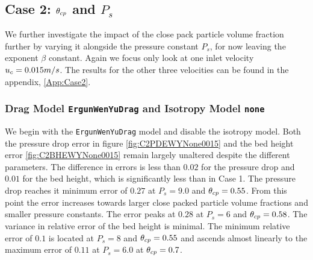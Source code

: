 



\subsection{Case 2: $\theta_{cp}$ and $P_s$}
\label{sec:case2}
We further investigate the impact of the close pack particle volume fraction further by varying it alongside the pressure constant $P_s$, for now leaving the exponent $\beta$ constant.
Again we focus only look at one inlet velocity $u_c = 0.015 m/s$. The results for the other three velocities can be found in the appendix, \ref{App:Case2}.


\subsubsection{Drag Model \lstinline|ErgunWenYuDrag| and Isotropy Model \lstinline|none|}
We begin with the \lstinline|ErgunWenYuDrag| model and disable the isotropy model.
Both the pressure drop error in figure \ref{fig:C2PDEWYNone0015} and the bed height error \ref{fig:C2BHEWYNone0015} remain largely unaltered despite the different parameters.
The difference in errors is less than $0.02$ for the pressure drop and $0.01$ for the bed height, which is significantly less than in Case 1.
The pressure drop reaches it minimum error of $0.27$ at $P_s = 9.0$ and $\theta_{cp} = 0.55$. From this point the error increases towards larger close packed particle volume fractions and smaller pressure constants. The error peaks at $0.28$ at $P_s = 6$ and $\theta_{cp} = 0.58$.
The variance in relative error of the bed height is minimal. The minimum relative error of $0.1$ is located at $P_s = 8$ and $\theta_{cp} = 0.55$ and ascends almost linearly to the maximum error of $0.11$ at $P_s = 6.0$ at $\theta_{cp} = 0.7$.

